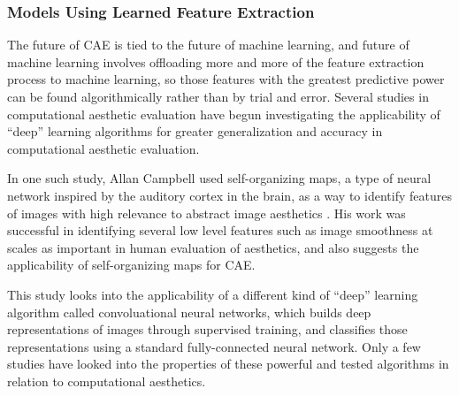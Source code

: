 \documentclass[midd]{thesis}
\begin{document}
\subsubsection{Models Using Learned Feature Extraction}

The future of CAE is tied to the future of machine learning, and future of machine learning involves offloading more and more of the feature extraction process to machine learning, so those features with the greatest predictive power can be found algorithmically rather than by trial and error. Several studies in computational aesthetic evaluation have begun investigating the applicability of ``deep'' learning algorithms for greater generalization and accuracy in computational aesthetic evaluation. 

In one such study, Allan Campbell used self-organizing maps, a type of neural network inspired by the auditory cortex in the brain, as a way to identify features of images with high relevance to abstract image aesthetics \cite{campbell2013self}. His work was successful in identifying several low level features such as image smoothness at scales as important in human evaluation of aesthetics, and also suggests the applicability of self-organizing maps for CAE.

This study looks into the applicability of a different kind of ``deep'' learning algorithm called convoluational neural networks, which builds deep representations of images through supervised training, and classifies those representations using a standard fully-connected neural network. Only a few studies have looked into the properties of these powerful and tested algorithms in relation to computational aesthetics.
\end{document}
